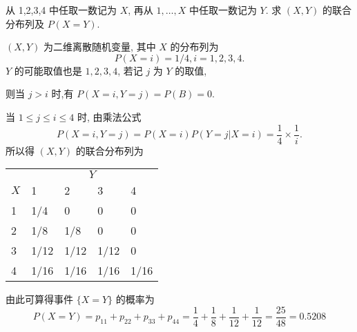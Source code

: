    \begin{example}\label{exam:3.1.2}
   		从 1,2,3,4 中任取一数记为 $X$, 再从 $1,\ldots,X$ 中任取一数记为 $Y$. 求 $(X,Y)$ 的联合分布列及 $P(X=Y)$.     
   \end{example}
   \begin{solution}
   		$(X,Y)$ 为二维离散随机变量, 其中 $X$ 的分布列为
         \[  
         	 P(X=i)=1/4,i=1,2,3,4.
         \]
		$Y$ 的可能取值也是 $1,2,3,4$, 若记 $j$ 为 $Y$ 的取值,

		 则当 $j>i$ 时,有 $P(X=i,Y=j)=P(B)=0$.
  
  		当 $1\leq j \leq i \leq 4$ 时, 由乘法公式
  		\[
  		 	P(X=i, Y=j)=P(X=i) P(Y=j | X=i)=\frac{1}{4} \times \frac{1}{i}.
  		\]
		所以得 $(X,Y)$ 的联合分布列为
		\begin{center}
			\begin{tabularx}{0.8\textwidth}{ZZZZZ}
			\toprule
			 &  		 \\
			 $X$&  	1	&  2	&  3&  		4\\
			  	&  1/4	&  0	&  0&  		0\\
			 	&  1/8	& 1/8 	&  0&  		0\\
			 	& 1/12	&  1/12	&  1/12&	0\\
			 &  1/16	&  1/16	&  1/16&  1/16\\
			 \bottomrule
			\end{tabularx} 
		\end{center}
		由此可算得事件 $\{X=Y\}$ 的概率为
		\[
		 	P(X=Y)=p_{11}+p_{22}+p_{33}+p_{44}=\frac{1}{4}+\frac{1}{8}+\frac{1}{12}+\frac{1}{12}=\frac{25}{48}=0.5208
		\]
   \end{solution}
